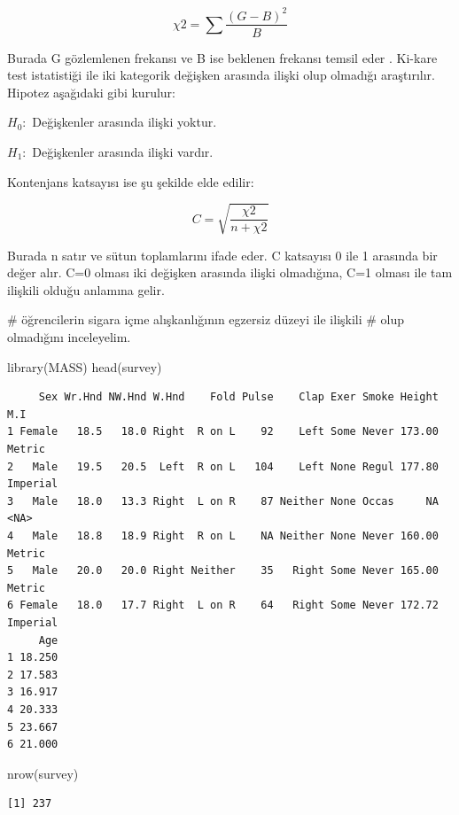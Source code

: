 \documentclass[
  letterpaper,
  DIV=11,
  numbers=noendperiod]{scrreprt}
\newenvironment{Shaded}{\begin{snugshade}}{\end{snugshade}}
\newcommand{\CommentTok}[1]{\textcolor[rgb]{0.37,0.37,0.37}{#1}}
\newcommand{\FunctionTok}[1]{\textcolor[rgb]{0.28,0.35,0.67}{#1}}
\newcommand{\NormalTok}[1]{\textcolor[rgb]{0.00,0.23,0.31}{#1}}
\begin{document}
\[ \chi 2=\sum\frac{(G-B)^2}{B} \]

Burada G gözlemlenen frekansı ve B ise beklenen frekansı temsil eder .
Ki-kare test istatistiği ile iki kategorik değişken arasında ilişki olup
olmadığı araştırılır. Hipotez aşağıdaki gibi kurulur:

\(H_0:\) Değişkenler arasında ilişki yoktur.

\(H_1:\) Değişkenler arasında ilişki vardır.

Kontenjans katsayısı ise şu şekilde elde edilir:

\[ C=\sqrt{\frac{\chi2}{n+\chi2}} \]

Burada n satır ve sütun toplamlarını ifade eder. C katsayısı 0 ile 1
arasında bir değer alır. C=0 olması iki değişken arasında ilişki
olmadığına, C=1 olması ile tam ilişkili olduğu anlamına gelir.

\begin{Shaded}
\begin{Highlighting}[]
\CommentTok{\# öğrencilerin sigara içme alışkanlığının egzersiz düzeyi ile ilişkili}
\CommentTok{\# olup olmadığını inceleyelim.}

\FunctionTok{library}\NormalTok{(MASS)}
\FunctionTok{head}\NormalTok{(survey)}
\end{Highlighting}
\end{Shaded}

\begin{verbatim}
     Sex Wr.Hnd NW.Hnd W.Hnd    Fold Pulse    Clap Exer Smoke Height      M.I
1 Female   18.5   18.0 Right  R on L    92    Left Some Never 173.00   Metric
2   Male   19.5   20.5  Left  R on L   104    Left None Regul 177.80 Imperial
3   Male   18.0   13.3 Right  L on R    87 Neither None Occas     NA     <NA>
4   Male   18.8   18.9 Right  R on L    NA Neither None Never 160.00   Metric
5   Male   20.0   20.0 Right Neither    35   Right Some Never 165.00   Metric
6 Female   18.0   17.7 Right  L on R    64   Right Some Never 172.72 Imperial
     Age
1 18.250
2 17.583
3 16.917
4 20.333
5 23.667
6 21.000
\end{verbatim}

\begin{Shaded}
\begin{Highlighting}[]
\FunctionTok{nrow}\NormalTok{(survey)}
\end{Highlighting}
\end{Shaded}

\begin{verbatim}
[1] 237
\end{verbatim}
\end{document}

